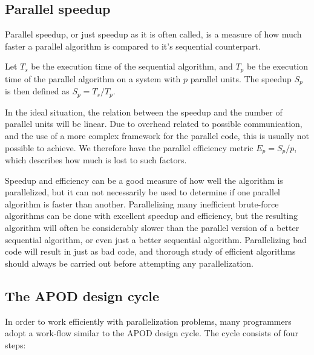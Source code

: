 \subsection{Parallel speedup} %
\label{sub:parallel_speedup}

Parallel speedup, or just speedup as it is often called, is a measure of how much faster a parallel algorithm is compared to it's sequential counterpart.

Let $T_s$ be the execution time of the sequential algorithm, and $T_p$ be the execution time of the parallel algorithm on a system with $p$ parallel units. The speedup $S_p$ is then defined as $S_p = T_s / T_p$.

In the ideal situation, the relation between the speedup and the number of parallel units will be linear. Due to overhead related to possible communication, and the use of a more complex framework for the parallel code, this is usually not possible to achieve. We therefore have the parallel efficiency metric $E_p = S_p / p$, which describes how much is lost to such factors.

Speedup and efficiency can be a good measure of how well the algorithm is parallelized, but it can not necessarily be used to determine if one parallel algorithm is faster than another. Parallelizing many inefficient brute-force algorithms can be done with excellent speedup and efficiency, but the resulting algorithm will often be considerably slower than the parallel version of a better sequential algorithm, or even just a better sequential algorithm. Parallelizing bad code will result in just as bad code, and thorough study of efficient algorithms should always be carried out before attempting any parallelization.

\subsection{The APOD design cycle} %
\label{sub:the_apod_design_cycle}

In order to work efficiently with parallelization problems, many programmers adopt a work-flow similar to the APOD design cycle\citep[Preface]{cuda_c_best_practices_guide}. The cycle consists of four steps:

